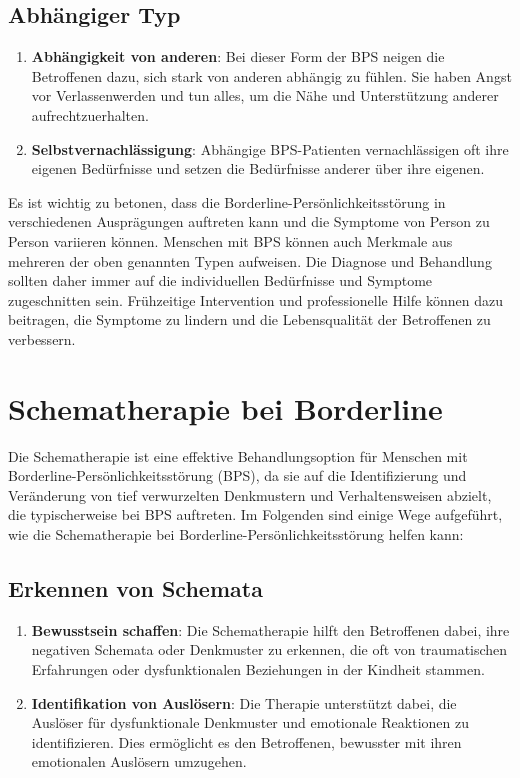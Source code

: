 \subsection{Abhängiger Typ}

\begin{enumerate}
\item \textbf{Abhängigkeit von anderen}: Bei dieser Form der BPS neigen die Betroffenen dazu, sich stark von anderen abhängig zu fühlen. Sie haben Angst vor Verlassenwerden und tun alles, um die Nähe und Unterstützung anderer aufrechtzuerhalten.

\item \textbf{Selbstvernachlässigung}: Abhängige BPS-Patienten vernachlässigen oft ihre eigenen Bedürfnisse und setzen die Bedürfnisse anderer über ihre eigenen.
\end{enumerate}
%
Es ist wichtig zu betonen, dass die Borderline-Persönlichkeitsstörung in verschiedenen Ausprägungen auftreten kann und die Symptome von Person zu Person variieren können. Menschen mit BPS können auch Merkmale aus mehreren der oben genannten Typen aufweisen. Die Diagnose und Behandlung sollten daher immer auf die individuellen Bedürfnisse und Symptome zugeschnitten sein. Frühzeitige Intervention und professionelle Hilfe können dazu beitragen, die Symptome zu lindern und die Lebensqualität der Betroffenen zu verbessern.
\section{Schematherapie bei Borderline}

Die Schematherapie ist eine effektive Behandlungsoption für Menschen mit Borderline-Persönlichkeitsstörung (BPS), da sie auf die Identifizierung und Veränderung von tief verwurzelten Denkmustern und Verhaltensweisen abzielt, die typischerweise bei BPS auftreten. Im Folgenden sind einige Wege aufgeführt, wie die Schematherapie bei Borderline-Persönlichkeitsstörung helfen kann:

\subsection{Erkennen von Schemata}

\begin{enumerate}
\item \textbf{Bewusstsein schaffen}: Die Schematherapie hilft den Betroffenen dabei, ihre negativen Schemata oder Denkmuster zu erkennen, die oft von traumatischen Erfahrungen oder dysfunktionalen Beziehungen in der Kindheit stammen.

\item \textbf{Identifikation von Auslösern}: Die Therapie unterstützt dabei, die Auslöser für dysfunktionale Denkmuster und emotionale Reaktionen zu identifizieren. Dies ermöglicht es den Betroffenen, bewusster mit ihren emotionalen Auslösern umzugehen.
\end{enumerate}

